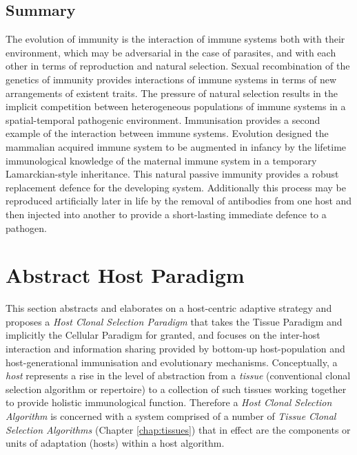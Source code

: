 \subsection{Summary}
\label{sec:hosts:biology:summary}
The evolution of immunity is the interaction of immune systems both with their environment, which may be adversarial in the case of parasites, and with each other in terms of reproduction and natural selection. Sexual recombination of the genetics of immunity provides interactions of immune systems in terms of new arrangements of existent traits. The pressure of natural selection results in the implicit competition between heterogeneous populations of immune systems in a spatial-temporal pathogenic environment. Immunisation provides a second example of the interaction between immune systems. Evolution designed the mammalian acquired immune system to be augmented in infancy by the lifetime immunological knowledge of the maternal immune system in a temporary Lamarckian-style inheritance. This natural passive immunity provides a robust replacement defence for the developing system. Additionally this process may be reproduced artificially later in life by the removal of antibodies from one host and then injected into another to provide a short-lasting immediate defence to a pathogen.

%
%
\section{Abstract Host Paradigm}
\label{sec:hosts:paradigm}
This section abstracts and elaborates on a host-centric adaptive strategy and proposes a \emph{Host Clonal Selection Paradigm} that takes the Tissue Paradigm and implicitly the Cellular Paradigm for granted, and focuses on the inter-host interaction and information sharing provided by bottom-up host-population and host-generational immunisation and evolutionary mechanisms. Conceptually, a \emph{host} represents a rise in the level of abstraction from a \emph{tissue} (conventional clonal selection algorithm or repertoire) to a collection of such tissues working together to provide holistic immunological function. Therefore a \emph{Host Clonal Selection Algorithm} is concerned with a system comprised of a number of \emph{Tissue Clonal Selection Algorithms} (Chapter \ref{chap:tissues}) that in effect are the components or units of adaptation (hosts) within a host algorithm.

%
%
